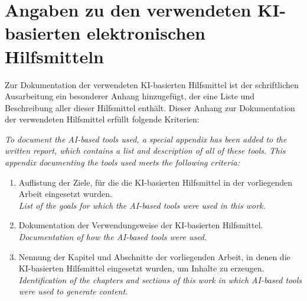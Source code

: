 \chapter*{Angaben zu den verwendeten KI-basierten elektronischen Hilfsmitteln}

Zur Dokumentation der verwendeten KI-basierten Hilfsmittel ist der schriftlichen Ausarbeitung ein besonderer Anhang hinzugefügt, der eine Liste und Beschreibung aller dieser Hilfsmittel enthält. Dieser Anhang zur Dokumentation der verwendeten Hilfsmittel erfüllt folgende Kriterien:

\emph{\small\color{dkfzgray2} To document the AI-based tools used, a special appendix has been added to the written report, which contains a list and description of all of these tools. This appendix documenting the tools used meets the following criteria:}

\begin{enumerate}
    \item Auflistung der Ziele, für die die KI-basierten Hilfsmittel in der vorliegenden Arbeit eingesetzt wurden.\\
    \emph{\small\color{dkfzgray2} List of the goals for which the AI-based tools were used in this work.}
    \item Dokumentation der Verwendungsweise der KI-basierten Hilfsmittel.\\
    \emph{\small\color{dkfzgray2} Documentation of how the AI-based tools were used.}
    \item Nennung der Kapitel und Abschnitte der vorliegenden Arbeit, in denen die KI-basierten Hilfsmittel eingesetzt wurden, um Inhalte zu erzeugen.\\
    \emph{\small\color{dkfzgray2} Identification of the chapters and sections of this work in which AI-based tools were used to generate content.}
\end{enumerate}


